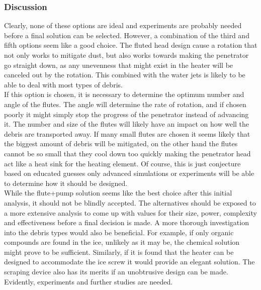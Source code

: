\subsubsection{Discussion}
Clearly, none of these options are ideal and experiments are probably needed before a final solution can be selected. However, a combination of the third and fifth options seem like a good choice. The fluted head design cause a rotation that not only works to mitigate dust, but also works towards making the penetrator go straight down, as any unevenness that might exist in the heater will be canceled out by the rotation. This combined with the water jets is likely to be able to deal with most types of debris. \\

\noindent
If this option is chosen, it is necessary to determine the optimum number and angle of the flutes. The angle will determine the rate of rotation, and if chosen poorly it might simply stop the progress of the penetrator instead of advancing it. The number and size of the flutes will likely have an impact on how well the debris are transported away. If many small flutes are chosen it seems likely that the biggest amount of debris will be mitigated, on the other hand the flutes cannot be so small that they cool down too quickly making the penetrator head act like a heat sink for the heating element. Of course, this is just conjecture based on educated guesses only advanced simulations or experiments will be able to determine how it should be designed.\\

\noindent
While the flute+pump solution seems like the best choice after this initial analysis, it should not be blindly accepted. The alternatives should be exposed to a more extensive analysis to come up with values for their size, power, complexity and effectiveness before a final decision is made. A more thorough investigation into the debris types would also be beneficial. For example, if only organic compounds are found in the ice, unlikely as it may be, the chemical solution might prove to be sufficient. Similarly, if it is found that the heater can be designed to accommodate the ice screw it would provide an elegant solution. The scraping device also has its merits if an unobtrusive design can be made.\\

\noindent
Evidently, experiments and further studies are needed.   







